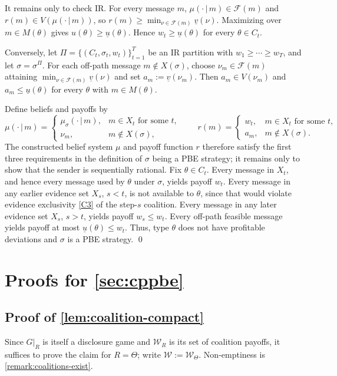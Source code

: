 \documentclass[11pt]{article}
\newcommand{\sep}{\,|\,}
\newcommand{\W}{\mathcal{W}}
\begin{document}
    It remains only to check IR. For every message $m$, $\mu(\cdot\sep m)\in \mathcal{F}(m)$ and
    $r(m)\in V(\mu(\cdot\sep m))$, so $r(m)\geq \min_{\nu\in \mathcal{F}(m)}\underline v(\nu)$. Maximizing
    over $m\in M(\theta)$ gives $u(\theta)\geq\underline u(\theta)$. Hence $w_t\geq\underline u(\theta)$ for every $\theta\in C_t$.

    Conversely, let $\Pi=\{(C_t,\sigma_t,w_t)\}_{t=1}^T$ be an IR partition with $w_1\geq\cdots\geq w_T$, and let
    $\sigma=\sigma^\Pi$. For each off-path message $m\notin X(\sigma)$, choose $\nu_m\in \mathcal{F}(m)$ attaining
    $\min_{\nu\in \mathcal{F}(m)}\underline v(\nu)$ and set $a_m:=\underline v(\nu_m)$. Then $a_m\in V(\nu_m)$ and
    $a_m\leq \underline u(\theta)$ for every $\theta$ with $m\in M(\theta)$.

    Define beliefs and payoffs by
    \[
        \mu(\cdot\sep m)=
        \begin{cases}
            \mu_\sigma(\cdot\sep m), & m\in X_t \text{ for some }t,\\
            \nu_m, & m\notin X(\sigma),
        \end{cases}
        \qquad
        r(m)=
        \begin{cases}
            w_t, & m\in X_t \text{ for some }t,\\
            a_m, & m\notin X(\sigma).
        \end{cases}
    \]
    The constructed belief system $\mu$ and payoff function $r$ therefore satisfy the first three requirements in the definition of $\sigma$ being a PBE strategy; it remains only to show that the sender is sequentially rational.
    Fix $\theta \in C_t$.
    Every message in $X_t$, and hence every message used by $\theta$ under $\sigma$, yields payoff $w_t$.
    Every message in any earlier evidence set $X_s$, $s<t$, is not available to $\theta$, since that would violate evidence exclusivity \cref{C3} of the step-$s$ coalition.
    Every message in any later evidence set $X_s$, $s>t$, yields payoff $w_s \leq w_t$.
    Every off-path feasible message yields payoff at most $\underline{u}(\theta) \leq w_t$.
    Thus, type $\theta$ does not have profitable deviations and $\sigma$ is a PBE strategy. \qed

\section{Proofs for \cref{sec:cppbe}}


\subsection*{Proof of \cref{lem:coalition-compact}}
Since $G\vert_R$ is itself a disclosure game and $\W_R$ is its set of coalition payoffs, it suffices to prove the claim for $R=\Theta$; write $\W:=\W_\Theta$. Non-emptiness is \cref{remark:coalitions-exist}.
\end{document}
